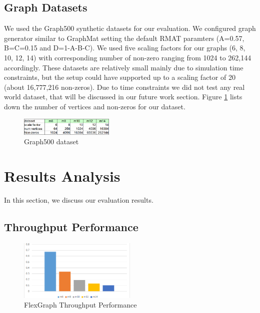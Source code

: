 \subsection{Graph Datasets}

We used the Graph500 \cite{Graph500} synthetic datasets for our evaluation. We configured graph generator similar to GraphMat \cite{GraphMat} setting the default RMAT paramters (A=0.57, B=C=0.15 and D=1-A-B-C). We used five scaling factors for our graphs (6, 8, 10, 12, 14) with corresponding number of non-zero ranging from 1024 to 262,144 accordingly. These datasets are relatively small mainly due to simulation time constraints, but the setup could have supported up to a scaling factor of 20 (about 16,777,216 non-zeros). Due to time constraints we did not test any real world dataset, that will be discussed in our future work section. Figure \ref{fig:graph500_dataset} lists down the number of vertices and non-zeros for our dataset.

\begin{figure}[htbp]
\centering
\includegraphics[width=0.4\textwidth]{figures/graph500_dataset}
\caption{Graph500 dataset}
\label{fig:graph500_dataset}
\end{figure}

\section{Results Analysis}

In this section, we discuss our evaluation results.

\subsection{Throughput Performance}

\begin{figure}[htbp]
\centering
\includegraphics[width=0.5\textwidth]{figures/dual_core_perf}
\caption{FlexGraph Throughput Performance}
\label{fig:dual_core_perf}
\end{figure}

